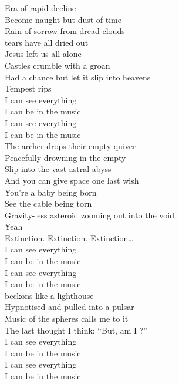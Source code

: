 Era of rapid decline \\
Become naught but dust of time \\
Rain of sorrow from dread clouds \\
 tears have all dried out \\
Jesus left us all alone \\
Castles crumble with a groan \\
Had a chance but let it slip into heavens \\
Tempest rips \\

I can see everything \\
I can be in the music \\
I can see everything \\
I can be in the music \\

The archer drops their empty quiver \\
Peacefully drowning in the empty  \\
Slip into the vast astral abyss \\
And you can give space one last wish \\

You're a baby being born \\
See the cable being torn \\
Gravity-less asteroid zooming out into the void \\
Yeah \\

Extinction. Extinction. Extinction… \\

I can see everything \\
I can be in the music \\
I can see everything \\
I can be in the music \\

 beckons like a lighthouse \\
Hypnotised and pulled into a pulsar \\
Music of the spheres calls me to it \\
The last thought I think: ``But, am I ?'' \\

I can see everything \\
I can be in the music \\
I can see everything \\
I can be in the music \\

